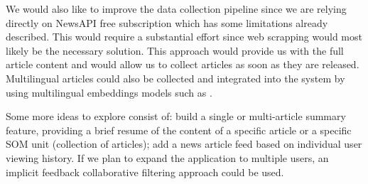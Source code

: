 \documentclass[a4paper]{article}
\begin{document}
We would also like to improve the data collection pipeline since we are relying directly on NewsAPI free subscription which has some limitations already described. This would require a substantial effort since web scrapping would most likely be the necessary solution. This approach would provide us with the full article content and would allow us to collect articles as soon as they are released. Multilingual articles could also be collected and integrated into the system by using multilingual embeddings models such as \citet{conneau2019}.

Some more ideas to explore consist of: build a single or multi-article summary feature, providing a brief resume of the content of a specific article or a specific SOM unit (collection of articles); add a news article feed based on individual user viewing history. If we plan to expand the application to multiple users, an implicit feedback collaborative filtering \citep{hu2008} approach could be used.



\end{document}
